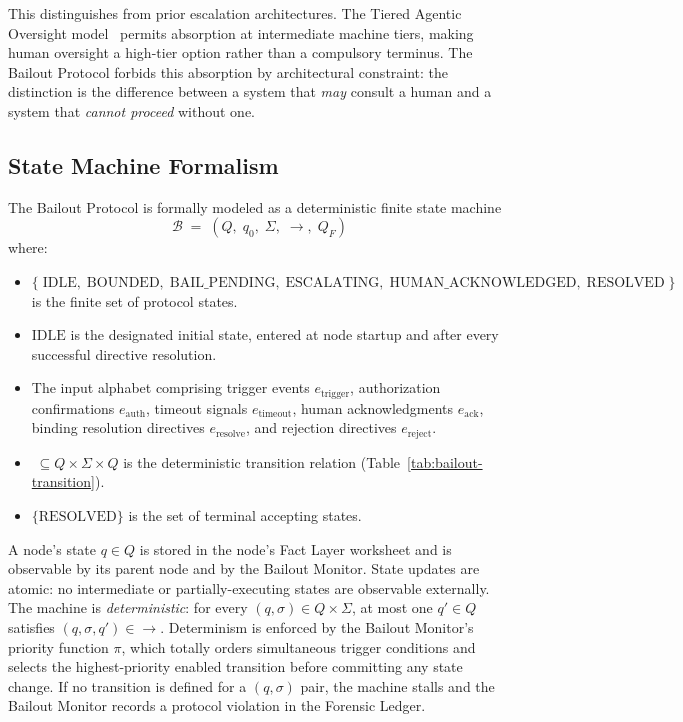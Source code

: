 This distinguishes \bxthree{} from prior escalation architectures. The Tiered Agentic Oversight model~\cite{kim2025tao} permits absorption at intermediate machine tiers, making human oversight a high-tier option rather than a compulsory terminus. The Bailout Protocol forbids this absorption by architectural constraint: the distinction is the difference between a system that \emph{may} consult a human and a system that \emph{cannot proceed} without one.

\subsection{State Machine Formalism}
\label{sec:state-machine}

The Bailout Protocol is formally modeled as a deterministic finite state machine
\begin{equation}
\mathcal{B} \;=\; (Q,\; q_0,\; \Sigma,\; \rightarrow,\; Q_F)
\end{equation}
where:

\begin{itemize}\itemsep=0pt
\item[$Q$] $\{\;\text{IDLE},\; \text{BOUNDED},\; \text{BAIL\_PENDING},\; \text{ESCALATING},\; \text{HUMAN\_ACKNOWLEDGED},\; \text{RESOLVED}\; \}$ is the finite set of protocol states.
\item[$q_0$] $\text{IDLE}$ is the designated initial state, entered at node startup and after every successful directive resolution.
\item[$\Sigma$] The input alphabet comprising trigger events $e_{\text{trigger}}$, authorization confirmations $e_{\text{auth}}$, timeout signals $e_{\text{timeout}}$, human acknowledgments $e_{\text{ack}}$, binding resolution directives $e_{\text{resolve}}$, and rejection directives $e_{\text{reject}}$.
\item[$\rightarrow$] $\;\subseteq Q \times \Sigma \times Q$ is the deterministic transition relation (Table~\ref{tab:bailout-transition}).
\item[$Q_F$] $\{\text{RESOLVED}\}$ is the set of terminal accepting states.
\end{itemize}

A node's state $q \in Q$ is stored in the node's Fact Layer worksheet and is observable by its parent node and by the Bailout Monitor. State updates are atomic: no intermediate or partially-executing states are observable externally. The machine is \emph{deterministic}: for every $(q, \sigma) \in Q \times \Sigma$, at most one $q' \in Q$ satisfies $(q, \sigma, q') \in \rightarrow$. Determinism is enforced by the Bailout Monitor's priority function $\pi$, which totally orders simultaneous trigger conditions and selects the highest-priority enabled transition before committing any state change. If no transition is defined for a $(q, \sigma)$ pair, the machine stalls and the Bailout Monitor records a protocol violation in the Forensic Ledger.

